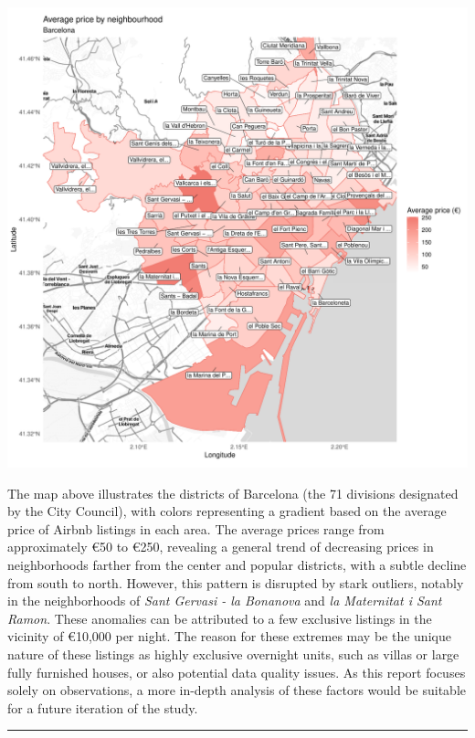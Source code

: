 \documentclass[
]{article}
\begin{document}
\begin{center}\includegraphics{Barcelona-AirBnB-Insights_files/figure-latex/plot10-1} \end{center}

The map above illustrates the districts of Barcelona (the 71 divisions
designated by the City Council), with colors representing a gradient
based on the average price of Airbnb listings in each area. The average
prices range from approximately €50 to €250, revealing a general trend
of decreasing prices in neighborhoods farther from the center and
popular districts, with a subtle decline from south to north. However,
this pattern is disrupted by stark outliers, notably in the
neighborhoods of \emph{Sant Gervasi - la Bonanova} and \emph{la
Maternitat i Sant Ramon}. These anomalies can be attributed to a few
exclusive listings in the vicinity of €10,000 per night. The reason for
these extremes may be the unique nature of these listings as highly
exclusive overnight units, such as villas or large fully furnished
houses, or also potential data quality issues. As this report focuses
solely on observations, a more in-depth analysis of these factors would
be suitable for a future iteration of the study.

\begin{center}\rule{0.5\linewidth}{0.5pt}\end{center}
\end{document}
